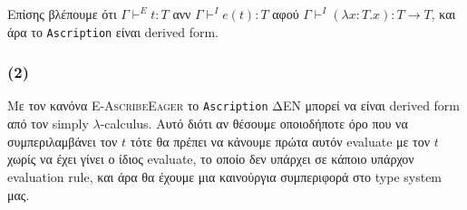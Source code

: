 \documentclass[a4paper,11pt]{article}
\begin{document}
Επίσης βλέπουμε ότι $\Gamma \vdash^E t:T$ ανν $\Gamma \vdash^I e(t):T$ αφού $\Gamma \vdash^I (\lambda x:T.x): T \rightarrow T$, και άρα το \verb|Ascription| είναι derived form.

\subsubsection*{(2)}
Με τον κανόνα \textsc{E-AscribeEager} το \verb|Ascription| ΔΕΝ μπορεί να είναι derived form από τον simply $\lambda$-calculus. Αυτό διότι αν θέσουμε οποιοδήποτε όρο που να συμπεριλαμβάνει τον $t$ τότε θα πρέπει να κάνουμε πρώτα αυτόν evaluate με τον $t$ χωρίς να έχει γίνει ο ίδιος evaluate, το οποίο δεν υπάρχει σε κάποιο υπάρχον evaluation rule, και άρα θα έχουμε μια καινούργια συμπεριφορά στο type system μας.
\end{document}
